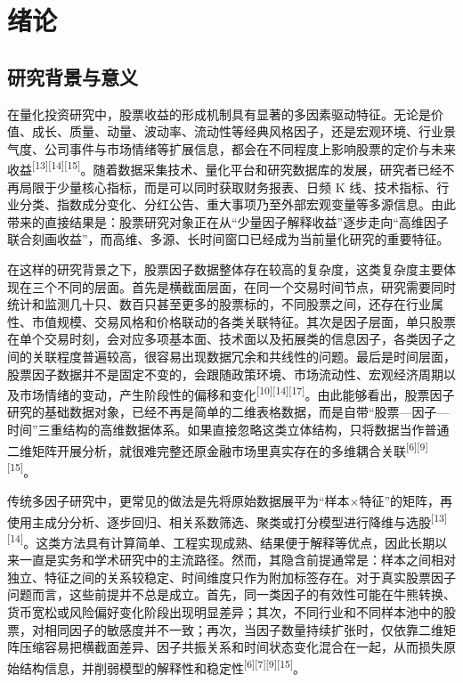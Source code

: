 \chapter{绪论}

\section{研究背景与意义}

在量化投资研究中，股票收益的形成机制具有显著的多因素驱动特征。无论是价值、成长、质量、动量、波动率、流动性等经典风格因子，还是宏观环境、行业景气度、公司事件与市场情绪等扩展信息，都会在不同程度上影响股票的定价与未来收益\textsuperscript{[13][14][15]}。随着数据采集技术、量化平台和研究数据库的发展，研究者已经不再局限于少量核心指标，而是可以同时获取财务报表、日频 K 线、技术指标、行业分类、指数成分变化、分红公告、重大事项乃至外部宏观变量等多源信息。由此带来的直接结果是：股票研究对象正在从“少量因子解释收益”逐步走向“高维因子联合刻画收益”，而高维、多源、长时间窗口已经成为当前量化研究的重要特征。

在这样的研究背景之下，股票因子数据整体存在较高的复杂度，这类复杂度主要体现在三个不同的层面。首先是横截面层面，在同一个交易时间节点，研究需要同时统计和监测几十只、数百只甚至更多的股票标的，不同股票之间，还存在行业属性、市值规模、交易风格和价格联动的各类关联特征。其次是因子层面，单只股票在单个交易时刻，会对应多项基本面、技术面以及拓展类的信息因子，各类因子之间的关联程度普遍较高，很容易出现数据冗余和共线性的问题。最后是时间层面，股票因子数据并不是固定不变的，会跟随政策环境、市场流动性、宏观经济周期以及市场情绪的变动，产生阶段性的偏移和变化\textsuperscript{[10][14][17]}。由此能够看出，股票因子研究的基础数据对象，已经不再是简单的二维表格数据，而是自带“股票—因子—时间”三重结构的高维数据体系。如果直接忽略这类立体结构，只将数据当作普通二维矩阵开展分析，就很难完整还原金融市场里真实存在的多维耦合关联\textsuperscript{[6][9][15]}。

传统多因子研究中，更常见的做法是先将原始数据展平为“样本$\times$特征”的矩阵，再使用主成分分析、逐步回归、相关系数筛选、聚类或打分模型进行降维与选股\textsuperscript{[13][14]}。这类方法具有计算简单、工程实现成熟、结果便于解释等优点，因此长期以来一直是实务和学术研究中的主流路径。然而，其隐含前提通常是：样本之间相对独立、特征之间的关系较稳定、时间维度只作为附加标签存在。对于真实股票因子问题而言，这些前提并不总是成立。首先，同一类因子的有效性可能在牛熊转换、货币宽松或风险偏好变化阶段出现明显差异；其次，不同行业和不同样本池中的股票，对相同因子的敏感度并不一致；再次，当因子数量持续扩张时，仅依靠二维矩阵压缩容易把横截面差异、因子共振关系和时间状态变化混合在一起，从而损失原始结构信息，并削弱模型的解释性和稳定性\textsuperscript{[6][7][9][15]}。

